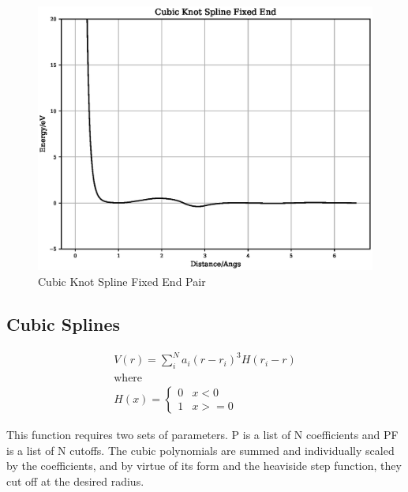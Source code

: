 \FloatBarrier
\begin{figure}[h]
  \begin{center}
    \includegraphics[scale=0.5]{appendix/functions/plots/cubic_knot_spline_fixed_end_pair.eps}
    \caption{Cubic Knot Spline Fixed End Pair}
    \label{graph:graph1}
  \end{center}
\end{figure}
\FloatBarrier






\subsection{Cubic Splines}

\begin{equation}
\begin{split}
V(r) = \sum_i^N a_i (r - r_i)^3 H(r_i - r) \\
\text{where } \\
H(x) = \left\{ \begin{matrix} 0 & x<0 \\  1 & x >= 0 \end{matrix} \right . 
\end{split}
\label{eq:cubicSpline}
\end{equation}

This function requires two sets of parameters.  P is a list of N coefficients and PF is a list of N cutoffs.  The cubic polynomials are summed and individually scaled by the coefficients, and by virtue of its form and the heaviside step function, they cut off at the desired radius. 

